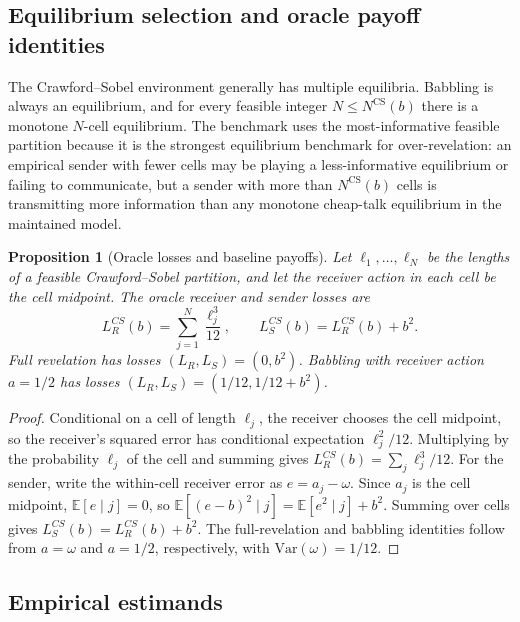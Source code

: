 \documentclass[11pt]{article}
\newtheorem{proposition}{Proposition}
\newcommand{\E}{\mathbb{E}}
\newcommand{\NCS}{N^{\mathrm{CS}}}
\begin{document}
\subsection{Equilibrium selection and oracle payoff identities}\label{sec:oracle-theory}

The Crawford--Sobel environment generally has multiple equilibria.  Babbling is always an equilibrium, and for every feasible integer $N\leq \NCS(b)$ there is a monotone $N$-cell equilibrium.  The benchmark uses the most-informative feasible partition because it is the strongest equilibrium benchmark for over-revelation: an empirical sender with fewer cells may be playing a less-informative equilibrium or failing to communicate, but a sender with more than $\NCS(b)$ cells is transmitting more information than any monotone cheap-talk equilibrium in the maintained model.

\begin{proposition}[Oracle losses and baseline payoffs]\label{prop:losses}
Let $\ell_1,\ldots,\ell_N$ be the lengths of a feasible Crawford--Sobel partition, and let the receiver action in each cell be the cell midpoint.  The oracle receiver and sender losses are
\begin{equation}
    L_R^{CS}(b)=\sum_{j=1}^{N}\frac{\ell_j^3}{12},
    \qquad
    L_S^{CS}(b)=L_R^{CS}(b)+b^2.
\end{equation}
Full revelation has losses $(L_R,L_S)=(0,b^2)$.  Babbling with receiver action $a=1/2$ has losses $(L_R,L_S)=(1/12,1/12+b^2)$.
\end{proposition}

\begin{proof}
Conditional on a cell of length $\ell_j$, the receiver chooses the cell midpoint, so the receiver's squared error has conditional expectation $\ell_j^2/12$.  Multiplying by the probability $\ell_j$ of the cell and summing gives $L_R^{CS}(b)=\sum_j\ell_j^3/12$.  For the sender, write the within-cell receiver error as $e=a_j-\omega$.  Since $a_j$ is the cell midpoint, $\E[e\mid j]=0$, so $\E[(e-b)^2\mid j]=\E[e^2\mid j]+b^2$.  Summing over cells gives $L_S^{CS}(b)=L_R^{CS}(b)+b^2$.  The full-revelation and babbling identities follow from $a=\omega$ and $a=1/2$, respectively, with $\mathrm{Var}(\omega)=1/12$.
\end{proof}

\subsection{Empirical estimands}
\end{document}
